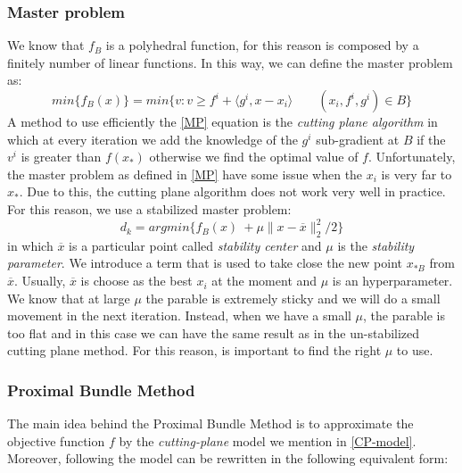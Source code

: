 \subsubsection{Master problem}
We know that $f_B$ is a polyhedral function, for this reason is composed by a finitely number of linear functions.
In this way, we can define the master problem as:
\begin{equation}
\label{MP}
min\{f_B(x)\} = min\{v : v \geq f^i + \langle g^i, x-x_i \rangle \qquad (x_i, f^i, g^i) \in B \}
\end{equation} 
A method to use efficiently the \ref{MP} equation is the \textit{cutting plane algorithm} in which at every iteration we add the knowledge of the $g^i$ sub-gradient at $B$ if the $v^i$ is greater than $f(x_*)$ otherwise we find the optimal value of $f$.  
Unfortunately, the master problem as defined in \ref{MP} have some issue when the $x_i$ is very far to $x_*$. Due to this, the cutting plane algorithm does not work very well in practice.
For this reason, we use a stabilized master problem: 
\begin{equation}
\label{SMP}
 d_{k}=argmin\{f_B(x)\ + \mu \parallel x- \overline{x}\parallel_{2}^2/2 \}
\end{equation} 
in which $\overline{x}$ is a particular point called \textit{stability center} and $\mu$ is the \textit{stability parameter}. We introduce a term that is used to take close the new point $x_{*B}$ from $\overline{x}$.
Usually, $\overline{x}$ is choose as the best $x_i$ at the moment and $\mu$ is an hyperparameter.
We know that at large $\mu$ the parable is extremely sticky and we will do a small movement in the next iteration.
Instead, when we have a small $\mu$, the parable is too flat and in this case we can have the same result as in the un-stabilized cutting plane method. For this reason, is important to find the right $\mu$ to use.
\subsubsection{Proximal Bundle Method}
The main idea behind the Proximal Bundle Method is to approximate the objective function $f$ by the \textit{cutting-plane} model we mention in \ref{CP-model}. Moreover, following \cite{NonsmoothOPT} the model can be rewritten in the following equivalent form: 


